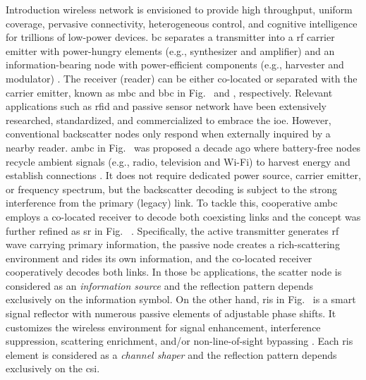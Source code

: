 \documentclass[journal]{IEEEtran}
\begin{document}
\begin{section}{Introduction}
	 wireless network is envisioned to provide high throughput, uniform coverage, pervasive connectivity, heterogeneous control, and cognitive intelligence for trillions of low-power devices.
	\gls{bc} separates a transmitter into a \gls{rf} carrier emitter with power-hungry elements (e.g., synthesizer and amplifier) and an information-bearing node with power-efficient components (e.g., harvester and modulator) \cite{Boyer2014}.
	The receiver (reader) can be either co-located or separated with the carrier emitter, known as \gls{mbc} and \gls{bbc} in Fig.~ and , respectively.
	Relevant applications such as \gls{rfid} \cite{Dobkin2012,Landt2005} and passive sensor network \cite{Vannucci2008,Assimonis2016} have been extensively researched, standardized, and commercialized to embrace the \gls{ioe}.
	However, conventional backscatter nodes only respond when externally inquired by a nearby reader.
	\gls{ambc} in Fig.~ was proposed a decade ago where battery-free nodes recycle ambient signals (e.g., radio, television and Wi-Fi) to harvest energy and establish connections \cite{Liu2013b}.
	It does not require dedicated power source, carrier emitter, or frequency spectrum, but the backscatter decoding is subject to the strong interference from the primary (legacy) link.
	To tackle this, cooperative \gls{ambc} \cite{Yang2018} employs a co-located receiver to decode both coexisting links and the concept was further refined as \gls{sr} in Fig.~ \cite{Liang2020}.
	Specifically, the active transmitter generates \gls{rf} wave carrying primary information, the passive node creates a rich-scattering environment and rides its own information, and the co-located receiver cooperatively decodes both links.
	In those \gls{bc} applications, the scatter node is considered as an \emph{information source} and the reflection pattern depends exclusively on the information symbol.
	On the other hand, \gls{ris} in Fig.~ is a smart signal reflector with numerous passive elements of adjustable phase shifts.
	It customizes the wireless environment for signal enhancement, interference suppression, scattering enrichment, and/or non-line-of-sight bypassing \cite{Wu2021b}.
	Each \gls{ris} element is considered as a \emph{channel shaper} and the reflection pattern depends exclusively on the \gls{csi}.


\end{section}
\end{document}
